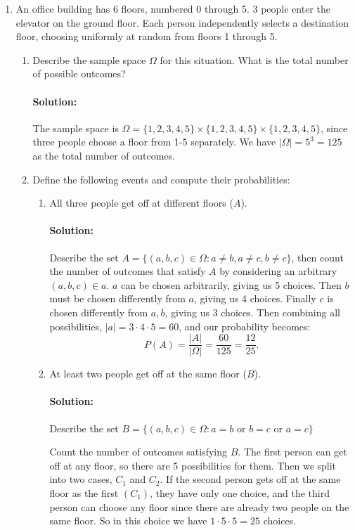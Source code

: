 \documentclass{article}
\begin{document}
\begin{enumerate} 
    \item  An office building has 6 floors, numbered 0 through 5. 3 people enter the elevator on the ground floor. Each person independently selects a destination floor, choosing uniformly at random from floors 1 through 5.
        \begin{enumerate}
            \item Describe the sample space $\Omega$ for this situation. What is the total number of possible outcomes?
                \paragraph{Solution: }The sample space is $\Omega=\{1,2,3,4,5\}\times \{1,2,3,4,5\}\times \{1,2,3,4,5\}$, since three people choose a floor from 1-5 separately. We have $|\Omega|=5^3=125$ as the total number of outcomes.
            \item Define the following events and compute their probabilities: 
                \begin{enumerate}
                    \item All three people get off at different floors ($A$).
                        \paragraph{Solution: }Describe the set $A=\{(a,b,c)\in \Omega:a\neq b,a\neq c,b\neq c\} $, then count the number of outcomes that satisfy $A$ by considering an arbitrary $(a,b,c)\in a$. $a$ can be chosen arbitrarily, giving us 5 choices. Then $b$ must be chosen differently from $a$, giving us 4 choices. Finally $c$ is chosen differently from $a,b$, giving us $3$ choices. Then combining all possibilities, $|a|=3\cdot 4\cdot 5=60$, and our probability becomes:
                        \[
                        P(A)=\frac{|A|}{|\Omega|}=\frac{60}{125}=\frac{12}{25}
                        .\] 
                    \item At least two people get off at the same floor ($B$).
                        \paragraph{Solution: }Describe the set $B=\{(a,b,c)\in \Omega:a=b \text{ or } b=c \text{ or }a=c\} $

                        Count the number of outcomes satisfying $B$. The first person can get off at any floor, so there are 5 possibilities for them. Then we split into two cases, $C_1$ and $C_2$. If the second person gets off at the same floor as the first $(C_1)$, they have only one choice, and the third person can choose any floor since there are already two people on the same floor. So in this choice we have $1\cdot 5\cdot 5=25$ choices.


\end{enumerate}
\end{enumerate}
\end{enumerate}
\end{document}
